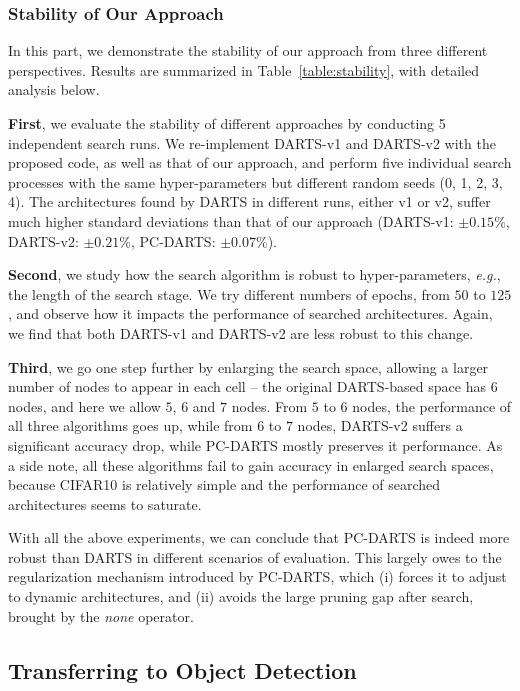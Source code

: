 \documentclass{article} \usepackage{iclr2020_conference,times}
\begin{document}
\subsubsection{Stability of Our Approach}

In this part, we demonstrate the stability of our approach from three different perspectives. Results are summarized in Table~\ref{table:stability}, with detailed analysis below.

\textbf{First}, we evaluate the stability of different approaches by conducting 5 independent search runs.  We re-implement DARTS-v1 and DARTS-v2 with the proposed code, as well as that of our approach, and perform five individual search processes with the same hyper-parameters but different random seeds (0, 1, 2, 3, 4). The architectures found by DARTS in different runs, either v1 or v2, suffer much higher standard deviations than that of our approach (DARTS-v1: $\pm0.15\%$, DARTS-v2: $\pm0.21\%$, PC-DARTS: $\pm0.07\%$).

\textbf{Second}, we study how the search algorithm is robust to hyper-parameters, \textit{e.g.}, the length of the search stage. We try different numbers of epochs, from $50$ to $125$, and observe how it impacts the performance of searched architectures. Again, we find that both DARTS-v1 and DARTS-v2 are less robust to this change.

\textbf{Third}, we go one step further by enlarging the search space, allowing a larger number of nodes to appear in each cell -- the original DARTS-based space has $6$ nodes, and here we allow $5$, $6$ and $7$ nodes. From $5$ to $6$ nodes, the performance of all three algorithms goes up, while from $6$ to $7$ nodes, DARTS-v2 suffers a significant accuracy drop, while PC-DARTS mostly preserves it performance. As a side note, all these algorithms fail to gain accuracy in enlarged search spaces, because CIFAR10 is relatively simple and the performance of searched architectures seems to saturate.

With all the above experiments, we can conclude that PC-DARTS is indeed more robust than DARTS in different scenarios of evaluation. This largely owes to the regularization mechanism introduced by PC-DARTS, which (i) forces it to adjust to dynamic architectures, and (ii) avoids the large pruning gap after search, brought by the \textit{none} operator.



\subsection{Transferring to Object Detection}
\end{document}
